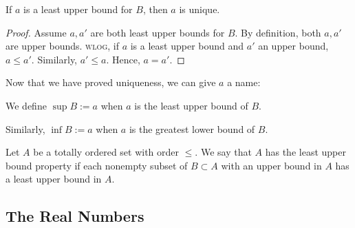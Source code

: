 \begin{lemma}
    If $a$ is a least upper bound for $B$, then $a$ is unique.
\end{lemma}
\begin{proof}
    Assume $a, a'$ are both least upper bounds for $B$. By definition, both $a, a'$ are upper bounds. \textsc{wlog}, if $a$ is a least upper bound and $a'$ an upper bound, $a\leq a'$. Similarly, $a'\leq a$. Hence, $a = a'$.
\end{proof}
Now that we have proved uniqueness, we can give $a$ a name:
\begin{definition}
    We define $\sup B := a$ when $a$ is the least upper bound of $B$.

    Similarly, $\inf B := a$ when $a$ is the greatest lower bound of $B$.
\end{definition}
\begin{definition}
    Let $A$ be a totally ordered set with order $\leq$. We say that $A$ has the least upper bound property if each nonempty subset of $B\subset A$ with an upper bound in $A$ has a least upper bound in $A$.
\end{definition}

\intentionalpagebreak
\subsection{The Real Numbers}

